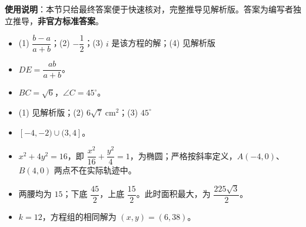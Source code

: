 
\begin{gknotice}
\textbf{使用说明}：本节只给最终答案便于快速核对，完整推导见解析版。答案为编写者独立推导，\textbf{非官方标准答案}。
\end{gknotice}

\begin{itemize}[leftmargin=2.6em]
  \item[\textbf{1.}] (1) $\dfrac{b-a}{a+b}$；(2) $-\dfrac12$；(3) $i$ 是该方程的解；(4) 见解析版
  \item[\textbf{2.}] $DE=\dfrac{ab}{a+b}$。
  \item[\textbf{3.}] $BC=\sqrt6$，$\angle C=45^\circ$。
  \item[\textbf{4.}] (1) 见解析版；(2) $6\sqrt7\ \mathrm{cm^2}$；(3) $45^\circ$
  \item[\textbf{5.}] $[-4,-2)\cup(3,4]$。
  \item[\textbf{6.}] $x^2+4y^2=16$，即 $\dfrac{x^2}{16}+\dfrac{y^2}{4}=1$，为椭圆；严格按斜率定义，$A(-4,0)$、$B(4,0)$ 两点不在实际轨迹中。
  \item[\textbf{7.}] 两腰均为 $15$；下底 $\dfrac{45}{2}$，上底 $\dfrac{15}{2}$。此时面积最大，为 $\dfrac{225\sqrt3}{2}$。
  \item[\textbf{8.}] $k=12$，方程组的相同解为 $(x,y)=(6,38)$。
\end{itemize}
